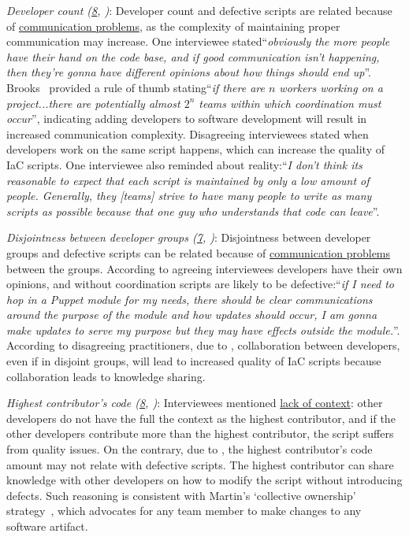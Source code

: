 \documentclass[smallextended]{svjour3}       %
\begin{document}
\textit{Developer count (\ul{8}, )}: Developer count and defective scripts are related because of \ul{communication problems}, as the complexity of maintaining proper communication may increase. One interviewee stated``\textit{obviously the more people have their hand on the code base, and if good communication isn't happening, then they're gonna have different opinions about how things should end up}''. Brooks~\citep{Brooks:MythicalManMonth:1995} provided a rule of thumb stating``\textit{if there are $n$ workers working on a project...there are potentially almost $2^{n}$ teams within which coordination must occur}'', indicating adding developers to software development will result in increased communication complexity. Disagreeing interviewees stated when developers work on the same script  happens, which can increase the quality of IaC scripts. One interviewee also reminded about reality:``\textit{I don't think its reasonable to expect that each script is maintained by only a low amount of people. Generally, they [teams] strive to have many people to write as many scripts as possible because that one guy who understands that code can leave}''. 


\textit{Disjointness between developer groups (\ul{7}, )}: Disjointness between developer groups and defective scripts can be related because of \ul{communication problems} between the groups. According to agreeing interviewees developers have their own opinions, and without coordination scripts are likely to be defective:``\textit{if I need to hop in a Puppet module for my needs, there should be clear communications around the purpose of the module and how updates should occur, I am gonna make updates to serve my purpose but they may have effects outside the module.}''. According to disagreeing practitioners, due to , collaboration between developers, even if in disjoint groups, will lead to increased quality of IaC scripts because collaboration leads to knowledge sharing.

\textit{Highest contributor's code (\ul{8}, )}: Interviewees mentioned \ul{lack of context}: other developers do not have the full the context as the highest contributor, and if the other developers contribute more than the highest contributor, the script suffers from quality issues. On the contrary, due to , the highest contributor's code amount may not relate with defective scripts. The highest contributor can share knowledge with other developers on how to modify the script without introducing defects. Such reasoning is consistent with Martin's `collective ownership' strategy~\citep{uncle:bob:clean:coder}, which advocates for any team member to make changes to any software artifact. 
\end{document}
